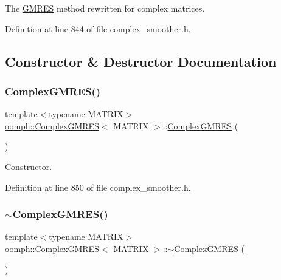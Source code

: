 The \hyperlink{classoomph_1_1GMRES}{G\+M\+R\+ES} method rewritten for complex matrices. 

Definition at line 844 of file complex\+\_\+smoother.\+h.



\subsection{Constructor \& Destructor Documentation}
\mbox{\label{classoomph_1_1ComplexGMRES_a8d0bfc83e16222c1eee97d8118505bae}} 
\subsubsection{\texorpdfstring{Complex\+G\+M\+R\+E\+S()}{ComplexGMRES()}\hspace{0.1cm}{\footnotesize\ttfamily [1/2]}}
{\footnotesize\ttfamily template$<$typename M\+A\+T\+R\+IX$>$ \\
\hyperlink{classoomph_1_1ComplexGMRES}{oomph\+::\+Complex\+G\+M\+R\+ES}$<$ M\+A\+T\+R\+IX $>$\+::\hyperlink{classoomph_1_1ComplexGMRES}{Complex\+G\+M\+R\+ES} (\begin{DoxyParamCaption}{ }\end{DoxyParamCaption})\hspace{0.3cm}{\ttfamily [inline]}}



Constructor. 



Definition at line 850 of file complex\+\_\+smoother.\+h.

\mbox{\label{classoomph_1_1ComplexGMRES_ade91020000a1b6bf316ff9753ac6498b}} 
\subsubsection{\texorpdfstring{$\sim$\+Complex\+G\+M\+R\+E\+S()}{~ComplexGMRES()}}
{\footnotesize\ttfamily template$<$typename M\+A\+T\+R\+IX$>$ \\
\hyperlink{classoomph_1_1ComplexGMRES}{oomph\+::\+Complex\+G\+M\+R\+ES}$<$ M\+A\+T\+R\+IX $>$\+::$\sim$\hyperlink{classoomph_1_1ComplexGMRES}{Complex\+G\+M\+R\+ES} (\begin{DoxyParamCaption}{ }\end{DoxyParamCaption})\hspace{0.3cm}{\ttfamily [inline]}}



